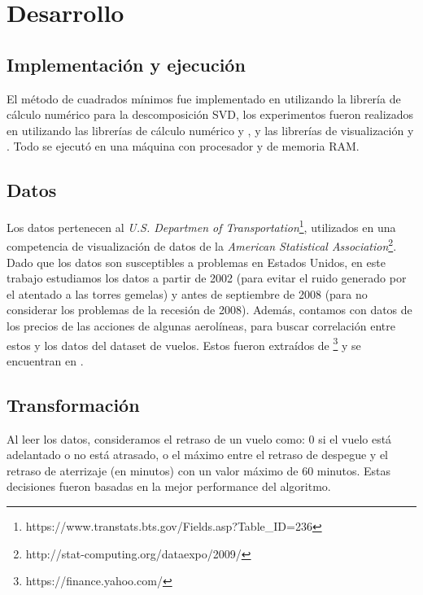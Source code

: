 \section{Desarrollo}\label{sec:desarrollo}

\subsection{Implementaci\'on y ejecuci\'on}\label{sec:ejecucion}
El m\'etodo de cuadrados m\'inimos fue implementado en  utilizando
la librer\'ia de c\'alculo num\'erico  para la descomposici\'on SVD,
los experimentos fueron realizados en  utilizando las librer\'ias
de c\'alculo num\'erico  y , y
las librer\'ias de visualizaci\'on  y .
Todo se ejecut\'o en una m\'aquina con procesador 
y  de memoria RAM.

\subsection{Datos}\label{subsec:datos}
Los datos pertenecen al \textit{U.S. Departmen of
Transportation}\footnote{https://www.transtats.bts.gov/Fields.asp?Table\_ID=236},
utilizados en una competencia de visualizaci\'on
de datos de la \textit{American Statistical Association}\footnote{
http://stat-computing.org/dataexpo/2009/}.
Dado que los datos son susceptibles a problemas en Estados Unidos, en este trabajo
estudiamos los datos a partir de 2002 (para evitar el ruido generado por el atentado a las torres
gemelas) y antes de septiembre de 2008 (para no considerar los problemas de la recesi\'on de 2008).
Adem\'as, contamos con datos de los precios de las acciones de algunas aerol\'ineas, para
buscar correlaci\'on entre estos y los datos del dataset de vuelos. Estos fueron extra\'idos de
\footnote{https://finance.yahoo.com/} y se encuentran en
.

\subsection{Transformaci\'on}\label{subsec:transformacion}
Al leer los datos, consideramos el retraso de un vuelo como: 0 si el vuelo est\'a adelantado o no est\'a
atrasado, o el m\'aximo entre el retraso de despegue y el retraso de aterrizaje (en minutos) con un
valor m\'aximo de 60 minutos. Estas decisiones fueron basadas en la mejor performance del algoritmo.

